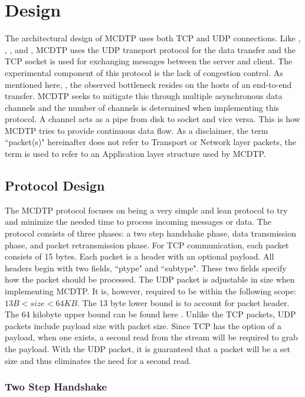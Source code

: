 \chapter{Design}

The architectural design of MCDTP uses both TCP and UDP connections. Like \cite{Meiss2007}, \cite{He2002}, \cite{Aspera2016}, and \cite{Fan2010}, MCDTP uses the UDP transport protocol for the data transfer and the TCP socket is used for exchanging messages between the server and client. The experimental component of this protocol is the lack of congestion control. As mentioned here, \cite{Aspera2016} \cite{Fan2010}, the observed bottleneck resides on the hosts of an end-to-end transfer. MCDTP seeks to mitigate this through multiple asynchronous data channels and the number of channels is determined when implementing this protocol. A channel acts as a pipe from disk to socket and vice versa. This is how MCDTP tries to provide continuous data flow. As a disclaimer, the term ``packet(s)" hereinafter does not refer to Transport or Network layer packets, the term is used to refer to an Application layer structure used by MCDTP.

\section{Protocol Design}

The MCDTP protocol focuses on being a very simple and lean protocol to try and minimize the needed time to process incoming messages or data. The protocol consists of three phases: a two step handshake phase, data transmission phase, and packet retransmission phase. For TCP communication, each packet consists of 15 bytes. Each packet is a header with an optional payload. All headers begin with two fields, ``ptype" and ``subtype". These two fields specify how the packet should be processed. The UDP packet is adjustable in size when implementing MCDTP. It is, however, required to be within the following scope: $13B < size < 64KB$. The 13 byte lower bound is to account for packet header. The 64 kilobyte upper bound can be found here \cite{postel1981ip}. Unlike the TCP packets, UDP packets include payload size with packet size. Since TCP has the option of a payload, when one exists, a second read from the stream will be required to grab the payload. With the UDP packet, it is guaranteed that a packet will be a set size and thus eliminates the need for a second read.

\subsection{Two Step Handshake}


